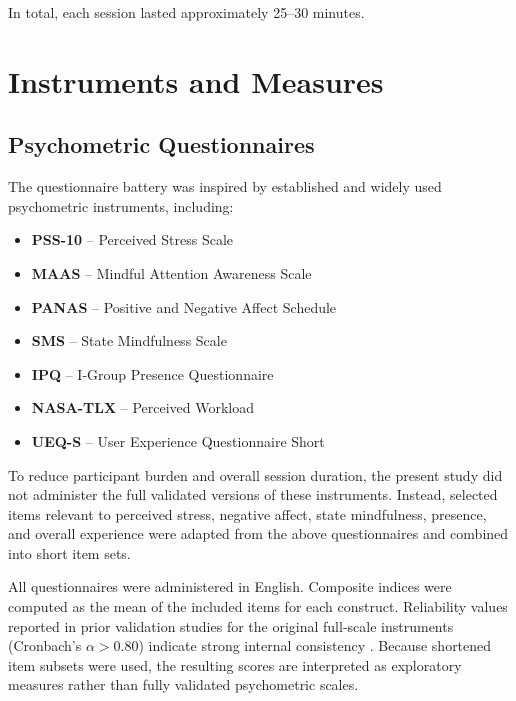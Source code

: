 In total, each session lasted approximately 25--30 minutes.


\section{Instruments and Measures}

\subsection{Psychometric Questionnaires}

The questionnaire battery was inspired by established and widely used
psychometric instruments, including:

\begin{itemize}
  \item \textbf{PSS-10} – Perceived Stress Scale \cite{cohen1983pss}  
  \item \textbf{MAAS} – Mindful Attention Awareness Scale \cite{brown2003maas}  
  \item \textbf{PANAS} – Positive and Negative Affect Schedule \cite{watson1988panas}  
  \item \textbf{SMS} – State Mindfulness Scale \cite{tanay2013sms}  
  \item \textbf{IPQ} – I-Group Presence Questionnaire \cite{schubert2001ipq}    
  \item \textbf{NASA-TLX} – Perceived Workload \cite{hart1988nasatlx}  
  \item \textbf{UEQ-S} – User Experience Questionnaire Short \cite{schrepp2017ueqs}
\end{itemize}

To reduce participant burden and overall session duration, the present study did not administer the full validated versions of these instruments. Instead, selected items relevant to perceived stress, negative affect, state mindfulness, presence, and overall experience were adapted from the above questionnaires and combined into short item sets.

All questionnaires were administered in English. Composite indices were computed as the mean of the included items for each construct. Reliability values reported in prior validation studies for the original full-scale instruments (Cronbach’s $\alpha > 0.80$) indicate strong internal consistency \cite{cohen1983pss,brown2003maas,watson1988panas,tanay2013sms,schubert2001ipq,hart1988nasatlx,schrepp2017ueqs}. Because shortened item subsets were used, the resulting scores are interpreted as exploratory measures rather than fully validated psychometric scales.


